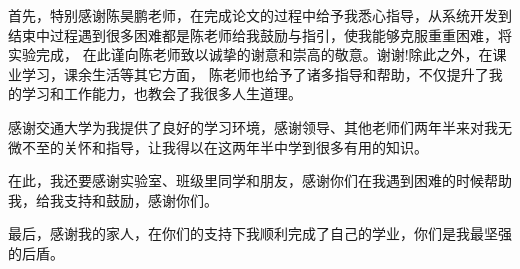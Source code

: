 \begin{thanks}
首先，特别感谢陈昊鹏老师，在完成论文的过程中给予我悉心指导，从系统开发到结束中过程遇到很多困难都是陈老师给我鼓励与指引，使我能够克服重重困难，将实验完成，
在此谨向陈老师致以诚挚的谢意和崇高的敬意。谢谢!除此之外，在课业学习，课余生活等其它方面，
陈老师也给予了诸多指导和帮助，不仅提升了我的学习和工作能力，也教会了我很多人生道理。

感谢交通大学为我提供了良好的学习环境，感谢领导、其他老师们两年半来对我无微不至的关怀和指导，让我得以在这两年半中学到很多有用的知识。

在此，我还要感谢实验室、班级里同学和朋友，感谢你们在我遇到困难的时候帮助我，给我支持和鼓励，感谢你们。

最后，感谢我的家人，在你们的支持下我顺利完成了自己的学业，你们是我最坚强的后盾。
\end{thanks}
